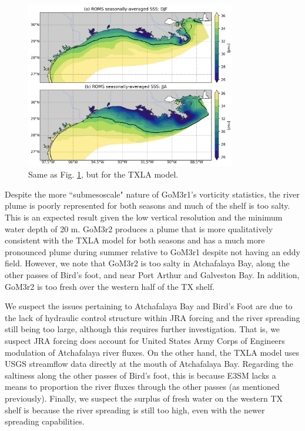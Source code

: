 \begin{figure}[t]
\centerline{\includegraphics[width=0.82\textwidth]{figures/scgsr/txla_sss_mean.jpg}}
    \caption{Same as Fig. \ref{fig:ROMS_sss}, but for the TXLA model.}
    \label{fig:ROMS_sss}
\end{figure}

Despite the more ``submesoscale" nature of GoM3r1's vorticity statistics, the river plume is poorly represented for both seasons and much of the shelf is too salty. This is an expected result given the low vertical resolution and the minimum water depth of 20 m. GoM3r2 produces a plume that is more qualitatively consistent with the TXLA model for both seasons and has a much more pronounced plume during summer relative to GoM3r1 despite not having an eddy field. However, we note that GoM3r2 is too salty in Atchafalaya Bay, along the other passes of Bird's foot, and near Port Arthur and Galveston Bay. In addition, GoM3r2 is too fresh over the western half of the TX shelf. 

We suspect the issues pertaining to Atchafalaya Bay and Bird's Foot are due to the lack of hydraulic control structure within JRA forcing and the river spreading still being too large, although this requires further investigation. That is, we suspect JRA forcing does account for United States Army Corps of Engineers modulation of Atchafalaya river fluxes. On the other hand, the TXLA model uses USGS streamflow data directly at the mouth of Atchafalaya Bay. Regarding the saltiness along the other passes of Bird's foot, this is because E3SM lacks a means to proportion the river fluxes through the other passes (as mentioned previously). Finally, we suspect the surplus of fresh water on the western TX shelf is because the river spreading is still too high, even with the newer spreading capabilities.

